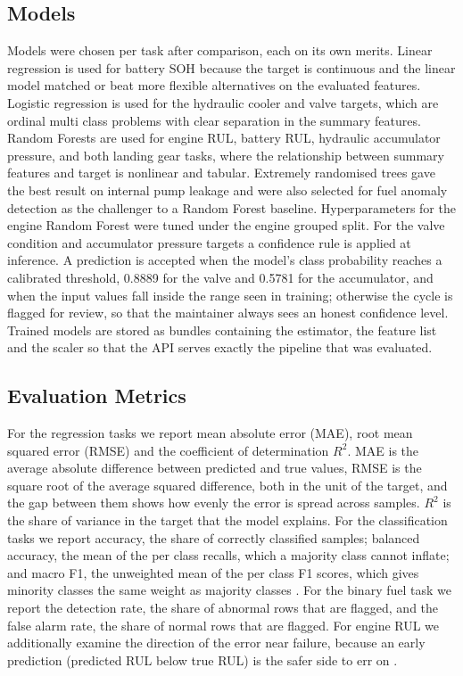 \documentclass[conference]{IEEEtran}
\begin{document}
\subsection{Models}\label{sec_models}
Models were chosen per task after comparison, each on its own merits. Linear regression is used for battery SOH because the target is continuous and the linear model matched or beat more flexible alternatives on the evaluated features. Logistic regression is used for the hydraulic cooler and valve targets, which are ordinal multi class problems with clear separation in the summary features. Random Forests \cite{b54} are used for engine RUL, battery RUL, hydraulic accumulator pressure, and both landing gear tasks, where the relationship between summary features and target is nonlinear and tabular. Extremely randomised trees \cite{b55} gave the best result on internal pump leakage and were also selected for fuel anomaly detection as the challenger to a Random Forest baseline. Hyperparameters for the engine Random Forest were tuned under the engine grouped split. For the valve condition and accumulator pressure targets a confidence rule is applied at inference. A prediction is accepted when the model's class probability reaches a calibrated threshold, 0.8889 for the valve and 0.5781 for the accumulator, and when the input values fall inside the range seen in training; otherwise the cycle is flagged for review, so that the maintainer always sees an honest confidence level. Trained models are stored as bundles containing the estimator, the feature list and the scaler so that the API serves exactly the pipeline that was evaluated.

\subsection{Evaluation Metrics}
For the regression tasks we report mean absolute error (MAE), root mean squared error (RMSE) and the coefficient of determination $R^2$. MAE is the average absolute difference between predicted and true values, RMSE is the square root of the average squared difference, both in the unit of the target, and the gap between them shows how evenly the error is spread across samples. $R^2$ is the share of variance in the target that the model explains. For the classification tasks we report accuracy, the share of correctly classified samples; balanced accuracy, the mean of the per class recalls, which a majority class cannot inflate; and macro F1, the unweighted mean of the per class F1 scores, which gives minority classes the same weight as majority classes \cite{b56}. For the binary fuel task we report the detection rate, the share of abnormal rows that are flagged, and the false alarm rate, the share of normal rows that are flagged. For engine RUL we additionally examine the direction of the error near failure, because an early prediction (predicted RUL below true RUL) is the safer side to err on \cite{b8, b14}.
\end{document}
